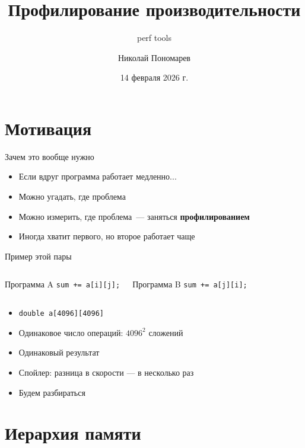 \documentclass[aspectratio=169, russian]{beamer}
\title{Профилирование производительности}
\subtitle{perf tools}
\author{Николай Пономарев}
\date{14 февраля 2026 г.}
\begin{document}
\begin{frame}
    \titlepage
\end{frame}

\section{Мотивация}

\begin{frame}{Зачем это вообще нужно}
    \begin{itemize}
        \item Если вдруг программа работает медленно...
        \item Можно угадать, где проблема
        \item Можно измерить, где проблема~--- заняться \textbf{профилированием}
        \item Иногда хватит первого, но второе работает чаще
    \end{itemize}
\end{frame}

\begin{frame}{Пример этой пары}
    \begin{columns}
        \begin{block}{Программа A}
            \texttt{sum += a[\alert{i}][\alert{j}];}
        \end{block}
        \begin{block}{Программа B}
            \texttt{sum += a[\alert{j}][\alert{i}];}
        \end{block}
    \end{columns}

    \bigskip
    \begin{itemize}
        \item \texttt{double a[4096][4096]}
        \item Одинаковое число операций: $4096^2$ сложений
        \item Одинаковый результат
        \item Спойлер: разница в скорости --- в несколько раз
        \item Будем разбираться
    \end{itemize}
\end{frame}

\section{Иерархия памяти}
\end{document}
